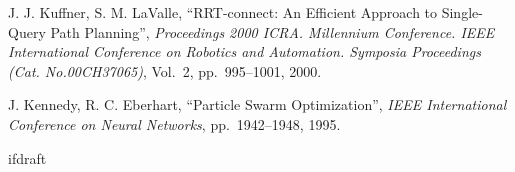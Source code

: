 \documentclass[a4paper,twoside,12pt,papersize, dvipdfmx]{iirthesis}
\begin{document}
\begin{thebibliography}{}
	J. J. Kuffner, S. M. LaValle, 
	``RRT-connect: An Efficient Approach to Single-Query Path Planning'',
	{\it Proceedings 2000 ICRA. Millennium Conference. IEEE International Conference on Robotics and Automation. Symposia Proceedings (Cat. No.00CH37065)}, 
	 Vol.~2, pp.~995--1001, 2000.
  	
  	J. Kennedy, R. C. Eberhart,
  	``Particle Swarm Optimization'',
  	{\it IEEE International Conference on Neural Networks},
  	pp.~1942--1948, 1995.
\end{thebibliography}

\expandafter\ifx\csname ifdraft\endcsname\relax
    
\end{document}

